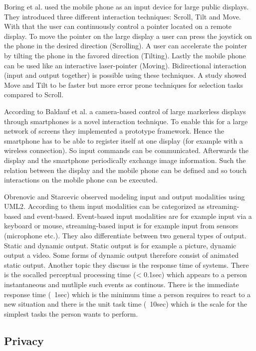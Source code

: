Boring et al. \cite{p161-boring} used the mobile phone as an input device for large public displays.
They introduced three different interaction techniques: Scroll, Tilt and Move. With that the user can continuously control a pointer located on a remote display.
To move the pointer on the large display a user can press the joystick on the phone in the desired direction (Scrolling).
A user can accelerate the pointer by tilting the phone in the favored direction (Tilting).
Lastly the mobile phone can be used like an interactive laser-pointer (Moving).
Bidirectional interaction (input and output together) is possible using these techniques.
A study showed Move and Tilt to be faster but more error prone techniques for selection tasks compared to Scroll.

According to Baldauf et al. \cite{a4-baldauf} a camera-based control of large markerless displays through smartphones is a novel interaction technique.
To enable this for a large network of screens they implemented a prototype framework.
Hence the smartphone has to be able to register itself at one display (for example with a wireless connection).
So input commands can be communicated.
Afterwards the display and the smartphone periodically exchange image information.
Such the relation between the display and the mobile phone can be defined and so touch interactions on the mobile phone can be executed.

Obrenovic and Starcevic \cite{obrenovic_modeling_2004} observed modeling input and output modalities using UML2.
According to them input modalities can be categorized as streaming-based and event-based.
Event-based input modalities are for example input via a keyboard or mouse, streaming-based input is for example input from sensors (microphone etc.).
They also differentiate between two general types of output.
Static and dynamic output.
Static output is for example a picture, dynamic output a video.
Some forms of dynamic output therefore consist of animated static output.
Another topic they discuss is the response time of systems.
There is the socalled perceptual processing time (< 0.1sec) which appears to a person instantaneous and mutliple such events as continous.
There is the immediate response time (~1sec) which is the minimum time a person requires to react to a new situation and there is the unit task time (~10sec) which is the scale for the simplest tasks the person wants to perform.

\subsection{Privacy}

